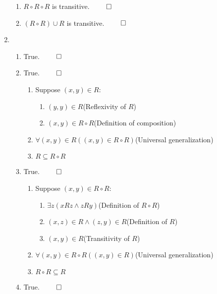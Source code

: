 \documentclass[12pt, a4paper]{article}
\begin{document}
\begin{enumerate}[Q\arabic*.]
\begin{enumerate}[(\alph*)]
      \item $R \circ R \circ R$ is transitive. $\qed$
        \begin{center}
        \end{center}

      \item $(R \circ R)\cup R$ is transitive. $\qed$
        \begin{center}
        \end{center}
    \end{enumerate}

  \pagebreak
  \item
    \begin{enumerate}[(\alph*)]
      \item True. $\qed$
      \item True. $\qed$
        \begin{enumerate}[label=\arabic*.,parsep=1em]
          \item Suppose $(x, y) \in R$:
            \begin{enumerate}[label=1.\arabic*., parsep=1em]
              \item $(y, y) \in R$\hfill(Reflexivity of $R$)
              \item $(x, y) \in R\circ R$\hfill(Definition of composition)
          \end{enumerate}
          \item $\forall (x,y)\in R((x,y) \in R\circ R)$\hfill(Universal generalization)
          \item $R \subseteq R\circ R$
        \end{enumerate}
      \item True. $\qed$
        \begin{enumerate}[label=\arabic*.,parsep=1em]
          \item Suppose $(x, y) \in R\circ R$:
            \begin{enumerate}[label=1.\arabic*., parsep=1em]
              \item $\exists z(xRz \land zRy)$\hfill(Definition of $R\circ R$)
              \item $(x, z) \in R \land (z, y) \in R$\hfill(Definition of $R$)
              \item $(x, y) \in R$\hfill(Transitivity of $R$)
          \end{enumerate}
          \item $\forall (x,y)\in R\circ R((x,y) \in R)$\hfill(Universal generalization)
          \item $R\circ R\subseteq R$
        \end{enumerate}
      \item True. $\qed$
    \end{enumerate}


\end{enumerate}
\end{document}
